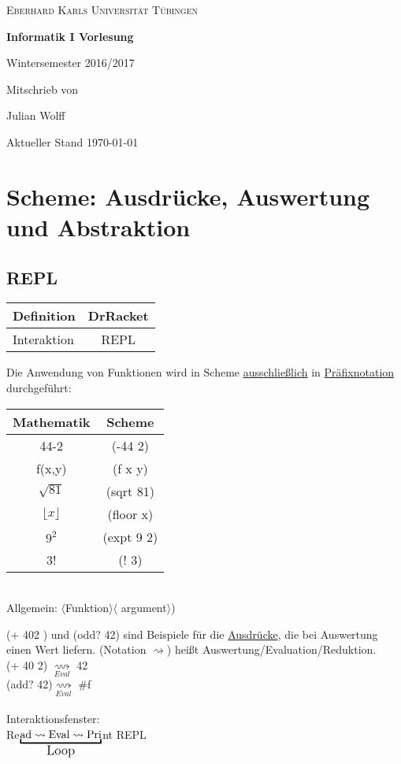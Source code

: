 \documentclass[a4paper,12pt]{article}
\begin{document}
\begin{titlepage}
\centering
	{\scshape\Large Eberhard Karls Universität Tübingen \par}
	\vspace{1cm}
	{\scshape\Large \par}
	\vspace{1.5cm}
	{\huge\bfseries Informatik I Vorlesung\par}
	\vspace{2cm}
	{\Large Wintersemester 2016/2017 \par}
	\vfill
	Mitschrieb von \par Julian Wolff

	\vfill

	{\large Aktueller Stand \today\par}
\end{titlepage}
\tableofcontents
\newpage
\section{Scheme: Ausdrücke, Auswertung und Abstraktion}
\subsection{REPL}
\begin{center}
\begin{tabular}{|l|c|}
\hline
Definition&DrRacket\\
\hline
Interaktion&REPL\\
\hline
\end{tabular}
\end{center}

Die Anwendung von Funktionen wird in Scheme \underline{ausschließlich} in \underline{Präfixnotation} durchgeführt:
\begin{center}
\begin{tabular}{|cc|}
\hline
Mathematik & Scheme\\
\hline
44-2 & (-44 2)\\
f(x,y) & (f x y)\\
$\sqrt{81}$ & (sqrt 81)\\
$\lfloor x\rfloor$& (floor x)\\
$9^2 $& (expt 9 2)\\
3! & (! 3)\\
\hline
\end{tabular}\\

Allgemein: $\langle $Funktion$\rangle \langle$ argument$\rangle$)
\end{center}
(+ 402 ) und (odd? 42) sind Beispiele für die \underline{Ausdrücke}, die bei Auswertung einen Wert liefern. (Notation $\rightsquigarrow$) heißt Auswertung/Evaluation/Reduktion.\\
(+ 40 2) $\underset{Eval}{\rightsquigarrow}$ 42\\
(add? 42)$\underset{Eval}{\rightsquigarrow}$ \#f\\
\\
Interaktionsfenster:\\ 
Re$\underset{\text{\large{Loop}}}{\underbracket{\text{ad}   \rightsquigarrow \text{Eval}  \rightsquigarrow \text{Pri} }}$nt      \hfil     REPL
\\
\\
\end{document}
